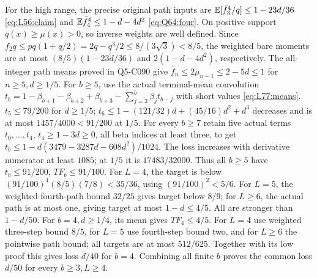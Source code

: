 For the high range, the precise original path inputs are
$\mathbb E[\bar f_3^4/q]\le1-23d/36$ \eqref{eq:L56:claim} and
$\mathbb E\bar f_4^4\le1-d-4d^2$ \eqref{eq:Q64:four}.
On positive support $q(x)\ge\mu(x)>0$, so inverse weights
are well defined. Since
$f_2q\le pq(1+q/2)=2q-q^3/2\le8/(3\sqrt3)<8/5$,
the weighted bare moments are at most
$(8/5)(1-23d/36)$ and $2(1-d-4d^2)$, respectively.
The all-integer path means proved in Q5-C090 give
$\bar f_n\le2\mu_{n-1}\le2-5d\le1$ for $n\ge5,d\ge1/5$.
For $b\ge5$, use the actual terminal-mean convolution
$t_b=1-\beta_{b+1}-\beta_{b+2}+\beta_{b+3}
-\sum_{j=3}^b\beta_jt_{b-j}$ with short values
\eqref{eq:L77:means}.
$t_5\le79/200$ for $d\ge1/5$;
$t_6\le1-(121/32)d+(45/16)d^2+d^3$ decreases and is at most
$1457/4000<91/200$ at $1/5$.
For every $b\ge7$ retain five actual terms $t_0,\ldots,t_4$,
$t_4\ge1-3d\ge0$, all beta indices at least three, to get
$t_b\le1-d(3479-3287d-608d^2)/1024$.
The loss increases with derivative numerator at least $1085$;
at $1/5$ it is $17483/32000$.
Thus all $b\ge5$ have $t_b\le91/200$, $TF_b\le91/100$.
For $L=4$, the target is below
$(91/100)^4(8/5)(7/8)<35/36$, using $(91/100)^2<5/6$.
For $L=5$, the weighted fourth-path bound $32/25$ gives target
below $8/9$; for $L\ge6$, the actual path is at most one, giving
target at most $1-d\le4/5$.
All are stronger than $1-d/50$.
For $b=4,d\ge1/4$, its mean gives $TF_4\le4/5$.
For $L=4$ use weighted three-step bound $8/5$, for $L=5$ use
fourth-step bound two, and for $L\ge6$ the pointwise path bound;
all targets are at most $512/625$.
Together with its low proof this gives loss $d/40$ for $b=4$.
Combining all finite $b$ proves the common loss $d/50$ for every
$b\ge3,L\ge4$.
